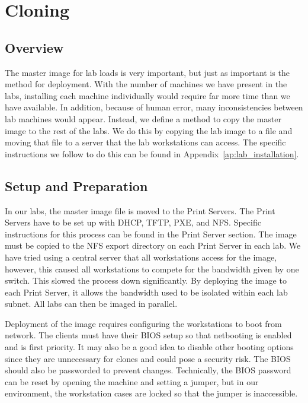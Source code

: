 \section{Cloning} \label{sec:cloning}
\subsection{Overview}
The master image for lab loads is very important, but just as important is the method for deployment.  With the number of machines we have present in the labs, installing each machine individually would require far more time than we have available.  In addition, because of human error, many inconsistencies between lab machines would appear.  Instead, we define a method to copy the master image to the rest of the labs.  We do this by copying the lab image to a file and moving that file to a server that the lab workstations can access.  The specific instructions we follow to do this can be found in Appendix~\ref{ap:lab_installation}.

\subsection{Setup and Preparation}
In our labs, the master image file is moved to the Print Servers.  The Print Servers have to be set up with DHCP, TFTP, PXE, and NFS.  Specific instructions for this process can be found in the Print Server section.  The image must be copied to the NFS export directory on each Print Server in each lab.  We have tried using a central server that all workstations access for the image, however, this caused all workstations to compete for the bandwidth given by one switch.  This slowed the process down significantly.  By deploying the image to each Print Server, it allows the bandwidth used to be isolated within each lab subnet.  All labs can then be imaged in parallel.  

Deployment of the image requires configuring the workstations to boot from network.  The clients must have their BIOS setup so that netbooting is enabled and is first priority.  It may also be a good idea to disable other booting options since they are unnecessary for clones and could pose a security risk.  The BIOS should also be passworded to prevent changes.  Technically, the BIOS password can be reset by opening the machine and setting a jumper, but in our environment, the workstation cases are locked so that the jumper is inaccessible.  

